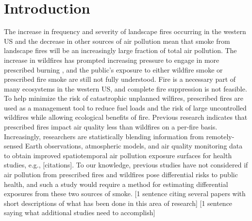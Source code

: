 \documentclass[authoryear]{elsarticle}
\begin{document}
\section{Introduction}
The increase in frequency and severity of landscape fires occurring in the western US \citep{Dennison2014,Steel2014} and the decrease in other sources of air pollution \citep{EPAPM25Trends2017} mean that smoke from landscape fires will be an increasingly large fraction of total air pollution.
The increase in wildfires has prompted increasing pressure to engage in more prescribed burning \citep{Stephens2005}, and the public's exposure to either wildfire smoke or prescribed fire smoke are still not fully understood.
Fire is a necessary part of many ecosystems in the western US, and complete fire suppression is  not feasible. 
To help minimize the risk of catastrophic unplanned wilfires, prescribed fires are used as a management tool to reduce fuel loads and the risk of large uncontrolled wildfires while allowing ecological benefits of fire. 
Previous research indicates that prescribed fires impact air quality  less than wildfires on a per-fire basis.  
Increasingly, researchers are statistically blending information from remotely-sensed Earth observations, atmospheric models, and air quality monitoring data to obtain improved spatiotemporal air pollution exposure surfaces for health studies, e.g., [citations]. 
To our knowledge, previous studies have not considered if air pollution from prescribed fires and wildfires pose differential risks to public health, and such a study would require a method for estimating differential exposures from these two sources of smoke. 
[1 sentence citing several papers with short descriptions of what has been done in this area of research]
[1 sentence saying what additional studies need to accomplish]
\end{document}
